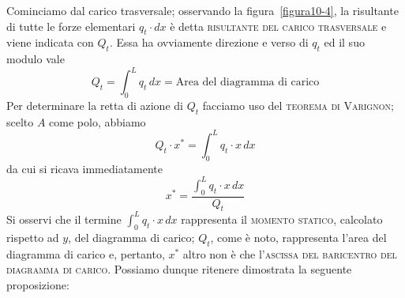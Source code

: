 Cominciamo dal carico trasversale; osservando la figura~\ref{figura10-4}, la risultante di tutte le forze elementari $q_{t}\cdot dx$ è detta \textsc{risultante del carico trasversale} e viene indicata con $Q_{t}$. Essa ha ovviamente direzione e verso di $q_{t}$ ed il suo modulo vale
\begin{equation} \label{equazione10-3}
\boxed{ Q_{t} = \int_{0}^{L} q_{t}\,dx = \text{Area del diagramma di carico}} \tag{10.3}
\end{equation}
Per determinare la retta di azione di $Q_{t}$ facciamo uso del \textsc{teorema di Varignon}; scelto $A$ come polo, abbiamo
\begin{equation*}
Q_{t} \cdot x^{*} = \int_{0}^{L} q_{t}\cdot x\,dx
\end{equation*}
da cui si ricava immediatamente
\begin{equation} \label{10-4}
\boxed{ x^{*} = \frac{ \int_{0}^{L} q_{t}\cdot x\,dx }{Q_{t}} } \tag{10.4}
\end{equation}
Si osservi che il termine $\int_{0}^{L} q_{t}\cdot x\,dx$ rappresenta il \textsc{momento statico}, calcolato rispetto ad $y$, del diagramma di carico; $Q_{t}$, come è noto, rappresenta l'area del diagramma di carico e, pertanto, $x^{*}$ altro non è che l'\textsc{ascissa del baricentro del diagramma di carico}. Possiamo dunque ritenere dimostrata la seguente proposizione:
\\

\\


